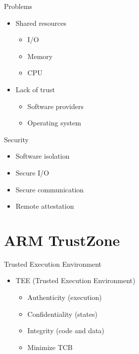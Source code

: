 \documentclass[]{beamer}
\begin{document}
\begin{frame}{Problems}
\begin{itemize}
\item Shared resources \begin{itemize}
\item I/O
\item Memory
\item CPU
\end{itemize}
\item Lack of trust \begin{itemize}
\item Software providers
\item Operating system
\end{itemize}
\end{itemize}
\end{frame}

\begin{frame}{Security}
\begin{itemize}
\item Software isolation
\item Secure I/O
\item Secure communication
\item Remote attestation
\end{itemize}
\end{frame}

\section{ARM TrustZone}

\begin{frame}{Trusted Execution Environment}
\begin{itemize}
\item TEE (Trusted Execution Environment) \begin{itemize}
\item Authenticity (execution)
\item Confidentiality (states)
\item Integrity (code and data)
\item Minimize TCB
\end{itemize}
\end{itemize}
\end{frame}
\end{document}
